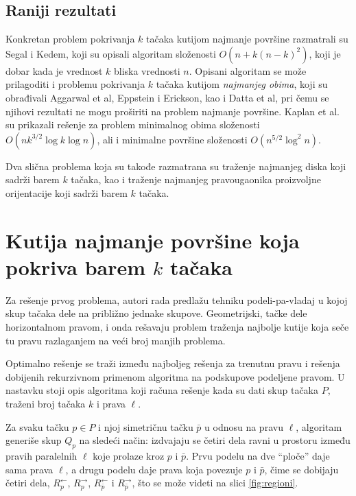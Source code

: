 \documentclass{article}
\begin{document}
\subsection{Raniji rezultati}

Konkretan problem pokrivanja $k$ tačaka kutijom najmanje površine razmatrali su Segal i Kedem, koji su opisali algoritam složenosti
$O ( n + k (n - k)^2 )$, koji je dobar kada je vrednost $k$ bliska vrednosti $n$. Opisani algoritam se može prilagoditi i problemu
pokrivanja $k$ tačaka kutijom {\em najmanjeg obima}, koji su obrađivali Aggarwal et al, Eppstein i Erickson, kao i Datta et al,
pri čemu se njihovi rezultati ne mogu proširiti na problem najmanje površine. Kaplan et al. su prikazali rešenje za problem minimalnog obima složenosti $O (n k^{3/2} \log k \log n)$, ali i minimalne površine složenosti $O (n^{5/2} \log^2 n)$.

Dva slična problema koja su takođe razmatrana su traženje najmanjeg diska koji sadrži barem $k$ tačaka, kao i traženje najmanjeg pravougaonika proizvoljne orijentacije koji sadrži barem $k$ tačaka.

\section{Kutija najmanje površine koja pokriva barem $k$ tačaka}

Za rešenje prvog problema, autori rada predlažu tehniku podeli-pa-vladaj u kojoj skup tačaka dele na približno jednake skupove. Geometrijski,
tačke dele horizontalnom pravom, i onda rešavaju problem traženja najbolje kutije koja seče tu pravu razlaganjem na veći broj manjih problema.

Optimalno rešenje se traži između najboljeg rešenja za trenutnu pravu i rešenja dobijenih rekurzivnom primenom algoritma na podskupove
podeljene pravom. U nastavku stoji opis algoritma koji računa rešenje kada su dati skup tačaka $P$, traženi broj tačaka $k$ i prava $\ell$.

Za svaku tačku $p \in P$ i njoj simetričnu tačku $\bar{p}$ u odnosu na pravu $\ell$, algoritam generiše skup $Q_p$ na sledeći način:
izdvajaju se četiri dela ravni u prostoru između pravih paralelnih $\ell$ koje prolaze kroz $p$ i $\bar{p}$. Prvu podelu na dve ``ploče'' daje sama prava $\ell$, a drugu podelu daje prava koja povezuje $p$ i $\bar{p}$, čime se dobijaju četiri dela, $R_p^\leftarrow$, $R_p^\rightarrow$, $R_{\bar{p}}^\leftarrow$ i $R_{\bar{p}}^\rightarrow$, što se može videti na slici \ref{fig:regioni}.
\end{document}

